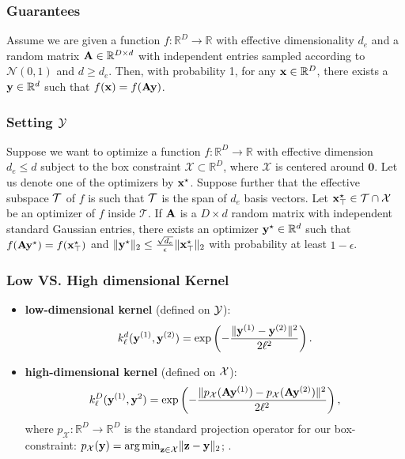 \documentclass[grey]{beamer}
\begin{document}
 \begin{frame}
  \frametitle{Guarantees}
  \begin{theorem}
   \label{prop:1}
   Assume we are given a function $f: \mathbb{R}^{D} \rightarrow \mathbb{R}$ with effective dimensionality $d_e$ and a random matrix $\mathbf{A} \in \mathbb{R}^{D\times d}$ with independent entries sampled according to $\mathcal{N}(0, 1)$ and $d\geq d_e$. Then, with probability 1, for any $\mathbf{x} \in \mathbb{R}^D$, there exists a $ \mathbf{y} \in \mathbb{R}^d$ such that $f(\mathbf{x}) = f(\mathbf{A}\mathbf{y})$.
  \end{theorem}
 \end{frame}
 
 \begin{frame}
  \frametitle{Setting $\cal Y$}
  \begin{theorem}
   \label{prop:2}
   Suppose we want to optimize a function $f: \mathbb{R}^{D} \rightarrow \mathbb{R}$ with effective dimension $d_e \leq d$ subject to the box constraint $\mathcal{X} \subset \mathbb{R}^D$, where $\mathcal{X}$ is centered around $\mathbf{0}$. Let us denote one of the optimizers by $\mathbf{x}^{\star}$.
   Suppose further that the effective subspace $\cal T$ of $f$ is such that $\cal T$ is the span of $d_e$ basis vectors. 
   Let $\mathbf{x}^{\star}_\top \in \cal{T} \cap \mathcal{X}$ be an optimizer of $f$ inside $\mathcal{T}$. 
   If $\mathbf{A}$ is a $D\times d$ random matrix with independent standard Gaussian entries,
   there exists an optimizer $\mathbf{y}^\star \in \mathbb{R}^{d}$ such that $f(\mathbf{A}\mathbf{y}^\star) = f(\mathbf{x}^\star_\top)$ and $\|\mathbf{y}^\star\|_2 \leq \frac{\sqrt{d_e}}{\epsilon}\|\mathbf{x}^{\star}_\top\|_2$ with probability at least $1-\epsilon$.
 \end{theorem}
 \end{frame}
 
 \begin{frame}
  \frametitle{Low VS. High dimensional Kernel}
  \begin{itemize}
   \item {\bf \textcolor{myColor}{low-dimensional kernel}} (defined on 
   {\bf \textcolor{myColor}{$\cal Y$}}):
  \[ k_{\ell}^d(\mathbf{y}^{(1)},\mathbf{y}^{(2)}) = \exp\left({-\frac{\|\mathbf{y}^{(1)}-\mathbf{y}^{(2)}\|^2}{2\ell^2}}\right). \]
   \item {\bf \textcolor{myColor}{high-dimensional kernel}} (defined on 
   {\bf \textcolor{myColor}{$\cal X$}}):  
  $$k_{\ell}^D(\mathbf{y}^{(1)}, \mathbf{y}^2) = \exp\left( -\frac{\| p_{\mathcal{X}}(\mathbf{A}\mathbf{y}^{(1)}) - p_{\mathcal{X}}(\mathbf{A}\mathbf{y}^{(2)}) \|^2}{2\ell^2} \right),$$
where $p_{\mathcal{X}}:\mathbb{R}^D \rightarrow \mathbb{R}^D$ is the standard projection operator for our box-constraint: $p_{\mathcal{X}}(\mathbf{y}) = {\arg \min}_{\mathbf{z}\in \mathcal{X}} \|\mathbf{z}-\mathbf{y}\|_2$; . 
  \end{itemize}

 \end{frame}
\end{document}
